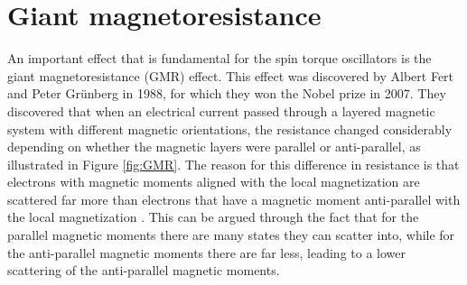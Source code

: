 \section{Giant magnetoresistance}
An important effect that is fundamental for the spin torque oscillators is the giant magnetoresistance (GMR) effect. This effect was discovered by Albert Fert \cite{Fert1988} and Peter Gr\"{u}nberg \cite{Grunberg1989} in 1988, for which they won the Nobel prize in 2007. They discovered that when an electrical current passed through a layered magnetic system with different magnetic orientations, the resistance changed considerably depending on whether the magnetic layers were parallel or anti-parallel, as illustrated in Figure \ref{fig:GMR}. The reason for this difference in resistance is that electrons with magnetic moments aligned with the local magnetization are scattered far more than electrons that have a magnetic moment anti-parallel with the local magnetization \cite{Chappert2007}. This can be argued through the fact that for the parallel magnetic moments there are many states they can scatter into, while for the anti-parallel magnetic moments there are far less, leading to a lower scattering of the anti-parallel magnetic moments.
